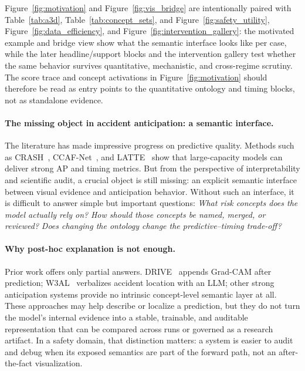 Figure~\ref{fig:motivation} and Figure~\ref{fig:vis_bridge} are intentionally paired with
Table~\ref{tab:a3d}, Table~\ref{tab:concept_sets}, and
Figure~\ref{fig:safety_utility}, Figure~\ref{fig:data_efficiency}, and
Figure~\ref{fig:intervention_gallery}:
the motivated example and bridge view show what the semantic interface looks like per case,
while the later headline/support blocks and the intervention gallery test whether
the same behavior survives quantitative, mechanistic, and cross-regime scrutiny.
The score trace and concept activations in Figure~\ref{fig:motivation} should
therefore be read as entry points to the quantitative ontology and timing
blocks, not as standalone evidence.


\paragraph{The missing object in accident anticipation: a semantic interface.}
The literature has made impressive progress on predictive quality.
Methods such as CRASH~\citep{liao2024crash}, CCAF-Net~\citep{liu2025ccaf}, and
LATTE~\citep{ZHANG2025103173} show that large-capacity models can deliver
strong AP and timing metrics. But from the perspective of interpretability and
scientific audit, a crucial object is still missing: an explicit semantic
interface between visual evidence and anticipation behavior. Without such an
interface, it is difficult to answer simple but important questions:
\emph{What risk concepts does the model actually rely on?}
\emph{How should those concepts be named, merged, or reviewed?}
\emph{Does changing the ontology change the predictive--timing trade-off?}

\paragraph{Why post-hoc explanation is not enough.}
Prior work offers only partial answers.
DRIVE~\citep{ref2} appends Grad-CAM after prediction;
W3AL~\citep{liao2024and} verbalizes accident location with an LLM;
other strong anticipation systems provide no intrinsic concept-level semantic
layer at all.
These approaches may help describe or localize a prediction, but they do not
turn the model's internal evidence into a stable, trainable, and auditable
representation that can be compared across runs or governed as a research
artifact. In a safety domain, that distinction matters: a system is easier to
audit and debug when its exposed semantics are part of the forward path, not an
after-the-fact visualization.

